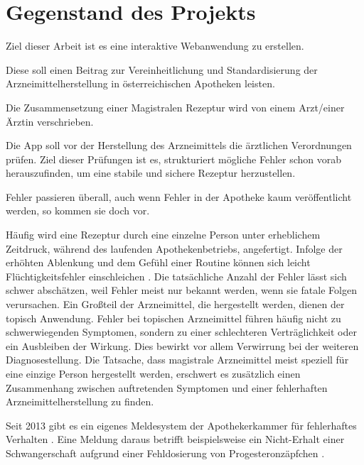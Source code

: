 \documentclass[12pt,a4paper]{article}
\begin{document}
\section{Gegenstand des Projekts}

Ziel dieser Arbeit ist es eine interaktive Webanwendung zu erstellen. 

Diese soll einen Beitrag zur Vereinheitlichung und Standardisierung der Arzneimittelherstellung in österreichischen Apotheken leisten. 

Die Zusammensetzung einer Magistralen Rezeptur wird von einem Arzt/einer Ärztin verschrieben. 

Die App soll vor der Herstellung des Arzneimittels die ärztlichen Verordnungen prüfen. Ziel dieser Prüfungen ist es, strukturiert mögliche Fehler schon vorab herauszufinden, um eine stabile und sichere Rezeptur herzustellen. 

Fehler passieren überall, auch wenn Fehler in der Apotheke kaum veröffentlicht werden, so kommen sie doch vor. 

Häufig wird eine Rezeptur durch eine einzelne Person unter erheblichem Zeitdruck, während des laufenden Apothekenbetriebs, angefertigt. Infolge der erhöhten Ablenkung und dem Gefühl einer Routine können sich leicht Flüchtigkeitsfehler einschleichen \cite{DAZ.online.2015}.
Die tatsächliche Anzahl der Fehler lässt sich schwer abschätzen, weil Fehler meist nur bekannt werden, wenn sie fatale Folgen verursachen. Ein Großteil der Arzneimittel, die hergestellt werden, dienen der topisch Anwendung. Fehler bei topischen Arzneimittel führen häufig nicht zu schwerwiegenden Symptomen, sondern zu einer schlechteren Verträglichkeit oder ein Ausbleiben der Wirkung. Dies bewirkt vor allem Verwirrung bei der weiteren Diagnosestellung. Die Tatsache, dass magistrale Arzneimittel meist speziell für eine einzige Person hergestellt werden, erschwert es zusätzlich einen Zusammenhang zwischen auftretenden Symptomen und einer fehlerhaften Arzneimittelherstellung zu finden. 


Seit 2013 gibt es ein eigenes Meldesystem der Apothekerkammer für fehlerhaftes Verhalten \cite{.25.03.2022b}. %
Eine Meldung daraus betrifft beispielsweise ein Nicht-Erhalt einer Schwangerschaft aufgrund einer Fehldosierung von Progesteronzäpfchen \cite{Holzer.2019}.
\end{document}
